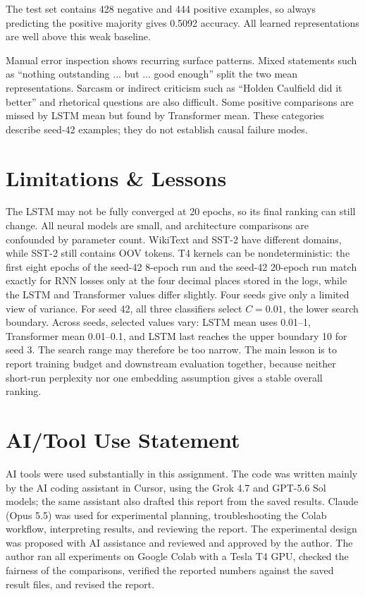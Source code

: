 \documentclass[11pt,a4paper]{article}
\begin{document}
The test set contains 428 negative and 444 positive examples, so always predicting the positive
majority gives 0.5092 accuracy. All learned representations are well above this weak baseline.

Manual error inspection shows recurring surface patterns. Mixed statements such as ``nothing
outstanding ... but ... good enough'' split the two mean representations. Sarcasm or indirect
criticism such as ``Holden Caulfield did it better'' and rhetorical questions are also difficult.
Some positive comparisons are missed by LSTM mean but found by Transformer mean. These categories
describe seed-42 examples; they do not establish causal failure modes.

\FloatBarrier

\section{Limitations \& Lessons}
The LSTM may not be fully converged at 20 epochs, so its final ranking can still change. All neural
models are small, and architecture comparisons are confounded by parameter count. WikiText and
SST-2 have different domains, while SST-2 still contains OOV tokens. T4 kernels can be
nondeterministic: the first eight epochs of the seed-42 8-epoch run and the seed-42 20-epoch
run match exactly for RNN losses only at the four decimal places stored in the logs, while the
LSTM and Transformer values differ slightly. Four seeds give only a limited view of
variance. For seed 42, all three classifiers select $C=0.01$, the lower search boundary. Across
seeds, selected values vary: LSTM mean uses 0.01--1, Transformer mean 0.01--0.1, and LSTM last
reaches the upper boundary 10 for seed 3. The search range may therefore be too narrow. The main
lesson is to report training budget and downstream evaluation together, because neither short-run
perplexity nor one embedding assumption gives a stable overall ranking.

\section{AI/Tool Use Statement}
AI tools were used substantially in this assignment. The code was written mainly by the AI coding
assistant in Cursor, using the Grok 4.7 and GPT-5.6 Sol models; the same assistant also drafted
this report from the saved results. Claude (Opus 5.5) was used for experimental planning,
troubleshooting the Colab workflow, interpreting results, and reviewing the report. The
experimental design was proposed with AI assistance and reviewed and approved by the author. The
author ran all experiments on Google Colab with a Tesla T4 GPU, checked the fairness of the
comparisons, verified the reported numbers against the saved result files, and revised the report.
\end{document}
